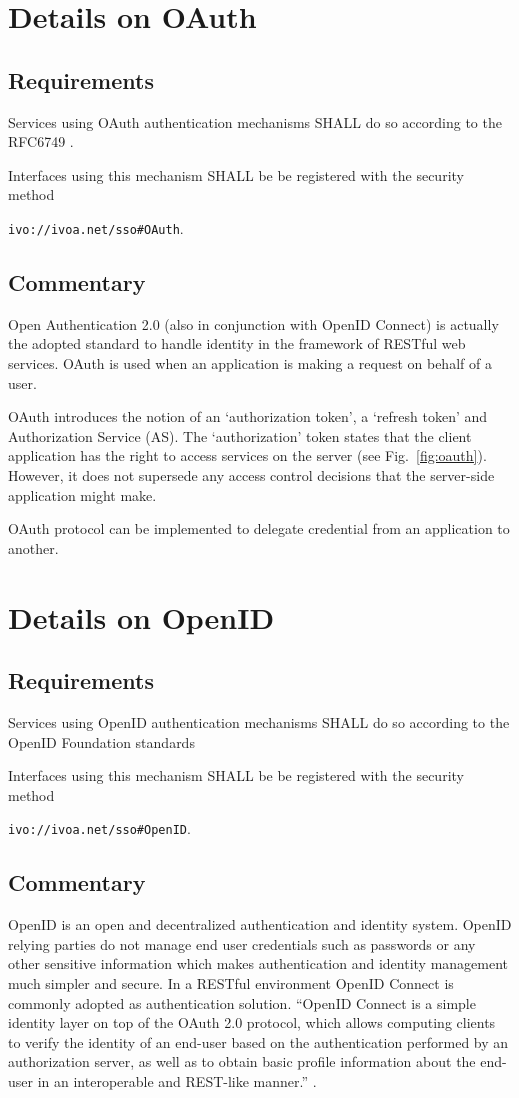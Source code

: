 \documentclass[11pt,a4paper]{ivoa}
\begin{document}
\section{Details on OAuth}
\subsection{Requirements}
Services using OAuth authentication mechanisms SHALL do so according to the RFC6749 \citep{std:RFC6749}.

Interfaces using this mechanism SHALL be be registered with the security method 

\texttt{ivo://ivoa.net/sso\#OAuth}.


\subsection{Commentary}
Open Authentication 2.0 (also in conjunction with OpenID Connect) is actually the adopted standard 
to handle identity in the framework of RESTful web services. 
OAuth is used when an application is making a request on behalf of a user.

OAuth introduces the notion of an `authorization token', a `refresh token' and Authorization Service (AS). 
The `authorization' token states that the client application has the right to access services on the server  (see Fig.~\ref{fig:oauth}). 
However, it does not supersede any access control decisions that the server-side application might make.

OAuth protocol can be implemented  to delegate credential from an application to another.

\section{Details on OpenID}
\subsection{Requirements}
Services using OpenID authentication mechanisms SHALL do so according to the OpenID Foundation standards \citep{std:openid}
  
Interfaces using this mechanism SHALL be be registered with the security method 

\texttt{ivo://ivoa.net/sso\#OpenID}.

  
\subsection{Commentary}
OpenID is an open and decentralized authentication and identity system. OpenID relying parties do not manage end user credentials 
such as passwords or any other sensitive information which makes authentication and identity management much simpler and secure.
In a RESTful environment OpenID Connect \citep{std:openidconnect} is commonly adopted as authentication solution. ``OpenID Connect  is a simple identity 
layer on top of the OAuth 2.0 protocol, which allows computing clients to verify the identity of an end-user based on the authentication
 performed by an authorization server, as well as to obtain basic profile information about the end-user in an interoperable and REST-like manner.'' \citep{std:openid}.
  
\end{document}

